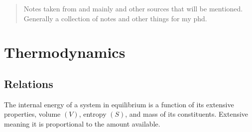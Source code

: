 
\def\ntitle{Dynamics Notes}

\maketitle
\begin{abstract}
    Notes taken from \cite{Vallis2019AtmosphericEdition} and \cite{Holton2015DynamicalOverview} mainly and other sources that will be mentioned. Generally a collection of notes and other things for my phd. 
\end{abstract}
\tableofcontents
\section{Thermodynamics}
\subsection{Relations} 
The internal energy of a system in equilibrium is a function of its extensive properties, volume $(V)$, entropy $(S)$, and mass of its constituents. Extensive meaning it is proportional to the amount available. 

